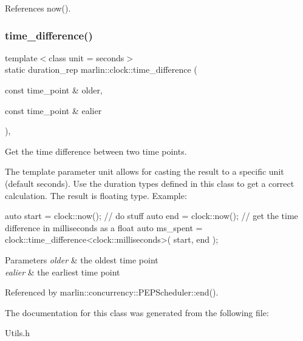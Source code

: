 References now().

\mbox{\label{classmarlin_1_1clock_a1b936336ffc180b1221c62ed2036c4b9}} 
\subsubsection{time\+\_\+difference()}
{\footnotesize\ttfamily template$<$class unit  = seconds$>$ \\
static duration\+\_\+rep marlin\+::clock\+::time\+\_\+difference (\begin{DoxyParamCaption}\item[{const time\+\_\+point \&}]{older,  }\item[{const time\+\_\+point \&}]{ealier }\end{DoxyParamCaption})\hspace{0.3cm}{\ttfamily [inline]}, {\ttfamily [static]}}



Get the time difference between two time points. 

The template parameter \textquotesingle{}unit\textquotesingle{} allows for casting the result to a specific unit (default seconds). Use the duration types defined in this class to get a correct calculation. The result is floating type. Example\+: 
\begin{DoxyCode}
\textcolor{keyword}{auto} start = clock::now();
\textcolor{comment}{// do stuff}
\textcolor{keyword}{auto} end = clock::now();
\textcolor{comment}{// get the time difference in milliseconds as a float}
\textcolor{keyword}{auto} ms\_spent = clock::time\_difference<clock::milliseconds>( start, end );
\end{DoxyCode}



\begin{DoxyParams}{Parameters}
{\em older} & the oldest time point \\
\hline
{\em ealier} & the earliest time point \\
\hline
\end{DoxyParams}


Referenced by marlin\+::concurrency\+::\+P\+E\+P\+Scheduler\+::end().



The documentation for this class was generated from the following file\+:\begin{DoxyCompactItemize}
\item 
Utils.\+h\end{DoxyCompactItemize}
